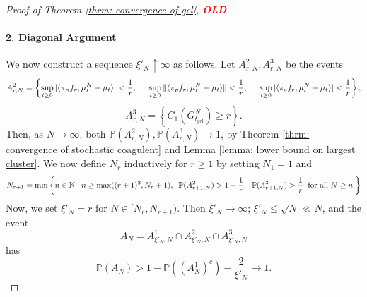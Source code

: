 \begin{proof}[Proof of Theorem \ref{thrm: convergence of gel}, \textcolor{red}{\textbf{OLD}}]
   \paragraph{2. Diagonal Argument} We now construct a sequence $\xi'_N \uparrow \infty$ as follows. Let $A^2_{r,N}, A^3_{r,N}$ be the events \begin{equation} \label{eq: definition of A2rn}
       A^2_{r,N}=\left\{\sup_{t\geq 0} |\langle \pi_n f_r, \mu^N_t-\mu_t\rangle|<\frac{1}{r}; \hspace{0.5cm} \sup_{t\ge 0}\|\langle \pi_p f_r, \mu^N_t-\mu_t\rangle\|<\frac{1}{r};\hspace{0.5cm} \sup_{t\ge 0}|\langle \pi_e f_r, \mu^N_t-\mu_t\rangle|<\frac{1}{r} \right\};
   \end{equation}
   \begin{equation}
       A^3_{r,N}=\left\{C_1(G^N_{t_\text{gel}}) \geq r\right\}.
   \end{equation} Then, as $N\rightarrow \infty$, both $\mathbb{P}(A^2_{r,N}), \mathbb{P}(A^3_{r,N}) \rightarrow 1$, by Theorem \ref{thrm: convergence of stochastic coagulent} and Lemma \ref{lemma: lower bound on largest cluster}. We now define $N_r$ inductively for $r\geq 1$ by setting $N_1=1$ and \begin{equation}
       \label{eq: recursive definition of Nr} N_{r+1}=\min\left\{n \in \mathbb{N}: n\geq \max((r+1)^2, N_r+1), \hspace{0.2cm}  \mathbb{P}(A^2_{r+1,N})>1-\frac{1}{r}, \hspace{0.2cm} \mathbb{P}(A^3_{r+1,N})>\frac{1}{r} \hspace{0.2cm} \text{for all }N\geq n. \right\}
   \end{equation} Now, we set $\xi'_N=r$ for $N\in [N_r, N_{r+1}).$ Then $\xi'_N \rightarrow \infty$; $\xi'_N\leq \sqrt{N}\ll N$, and the event \begin{equation} A_N=A^1_{\xi'_N, N} \cap A^2_{\xi'_N, N}\cap A^3_{\xi'_N, N} \end{equation} has \begin{equation}
       \mathbb{P}(A_N) >1-\mathbb{P}\left((A^1_N)^c\right)-\frac{2}{\xi'_N}\rightarrow 1.

\end{equation}
\end{proof}

